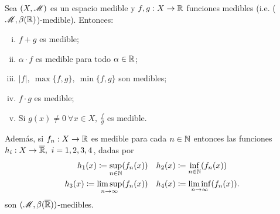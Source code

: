 \begin{prop}
	Sea $(X, \mathscr{M})$ es un espacio medible y $f,g : X \to \mathbb{R}$ funciones medibles (i.e. ($\mathscr{M},\beta(\mathbb{R})$)-medible). Entonces:
	\begin{enumerate}[i)]
		\item $f+g$ es medible;

		\item $\alpha \cdot f$ es medible para todo $\alpha \in \mathbb{R}$;

		\item $| f |, \ \max \{f,g\},\ \min \{f,g\}$ son medibles;

		\item $f \cdot g$ es medible;

		\item Si $g(x) \neq 0 \ \forall x \in X,\ \frac{f}{g}$ es medible.
	\end{enumerate}
	Además, si $f_n : X \to \mathbb{R}$ es medible para cada $n \in \mathbb{N}$ entonces las funciones $h_i : X \to \overline{\R},\ i=1,2,3,4$, dadas por
	\begin{align*}
		h_{1}(x) \coloneq \sup_{n\in\mathbb{N}} (f_n(x)) \quad & h_{2}(x) \coloneq \inf_{n\in\mathbb{N}} (f_n(x)) \\
		h_{3}(x) \coloneq \limsup_{n \to \infty} (f_n(x)) \quad & h_{4}(x) \coloneq \liminf_{n \to \infty} (f_n(x))
	.\end{align*}
	son $(\mathscr{M}, \beta(\overline{\mathbb{R}}))$-medibles.
\end{prop}
